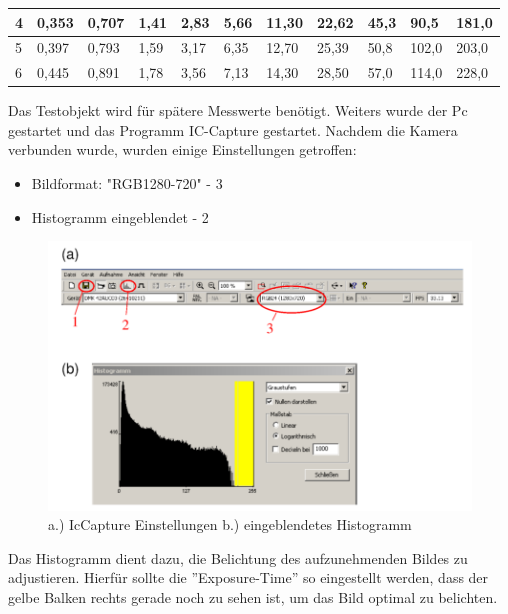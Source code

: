 \documentclass[12pt,a4paper,twoside]{article}
\begin{document}
\begin{table}[H]
\begin{tabular}{|l|llllllllll|}
    4           & \multicolumn{1}{l|}{0,353} & \multicolumn{1}{l|}{0,707} & \multicolumn{1}{l|}{1,41} & \multicolumn{1}{l|}{2,83} & \multicolumn{1}{l|}{5,66} & \multicolumn{1}{l|}{11,30} & \multicolumn{1}{l|}{22,62} & \multicolumn{1}{l|}{45,3} & \multicolumn{1}{l|}{90,5}  & 181,0 \\ \hline
    5           & \multicolumn{1}{l|}{0,397} & \multicolumn{1}{l|}{0,793} & \multicolumn{1}{l|}{1,59} & \multicolumn{1}{l|}{3,17} & \multicolumn{1}{l|}{6,35} & \multicolumn{1}{l|}{12,70} & \multicolumn{1}{l|}{25,39} & \multicolumn{1}{l|}{50,8} & \multicolumn{1}{l|}{102,0} & 203,0 \\ \hline
    6           & \multicolumn{1}{l|}{0,445} & \multicolumn{1}{l|}{0,891} & \multicolumn{1}{l|}{1,78} & \multicolumn{1}{l|}{3,56} & \multicolumn{1}{l|}{7,13} & \multicolumn{1}{l|}{14,30} & \multicolumn{1}{l|}{28,50} & \multicolumn{1}{l|}{57,0} & \multicolumn{1}{l|}{114,0} & 228,0 \\ \hline
\end{tabular}
\end{table}

\noindent
Das Testobjekt wird für spätere Messwerte benötigt. Weiters wurde der Pc gestartet und das Programm IC-Capture gestartet. Nachdem die Kamera verbunden wurde, wurden einige Einstellungen getroffen:

\begin{itemize}
    \item Bildformat: "RGB1280-720" - 3
    \item Histogramm eingeblendet - 2
\end{itemize}

\begin{figure}[H]
    \centering
    \includegraphics[width=0.5\linewidth]{nudes/IcCaptureSettings.png}
    \caption{a.) IcCapture Einstellungen b.) eingeblendetes Histogramm}
    \label{fig:IcCaptureSettings}
\end{figure}

\noindent
Das Histogramm dient dazu, die Belichtung des aufzunehmenden Bildes zu adjustieren. Hierfür sollte die ''Exposure-Time'' so eingestellt werden, dass der gelbe Balken rechts gerade noch zu sehen ist, um das Bild optimal zu belichten.
\end{document}
